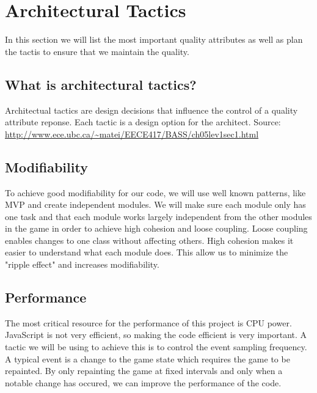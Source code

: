 \section{Architectural Tactics}
	In this section we will list the most important quality attributes as well as plan the tactis to 
	ensure that we maintain the quality.


\subsection*{What is architectural tactics? }
Architectual tactics are design decisions that influence the control of a quality attribute reponse. 
Each tactic is a design option for the architect. 
Source: \url{http://www.ece.ubc.ca/~matei/EECE417/BASS/ch05lev1sec1.html}

\subsection*{Modifiability}
To achieve good modifiability for our code, we will use well known patterns, like MVP and create 
independent modules. We will make sure each module only has one task and that each module works 
largely independent from the other modules in the game in order to achieve high cohesion and loose 
coupling. Loose coupling enables changes to one class without affecting others. High cohesion makes 
it easier to understand what each module does. This allow us to minimize the "ripple effect" and 
increases modifiability.

\subsection*{Performance}
The most critical resource for the performance of this project is CPU power. JavaScript is not very 
efficient, so making the code efficient is very important. A tactic we will be using to achieve this 
is to control the event sampling frequency. A typical event is a change to the game state which 
requires the game to be repainted. By only repainting the game at fixed intervals and only when a 
notable change has occured, we can improve the performance of the code.
